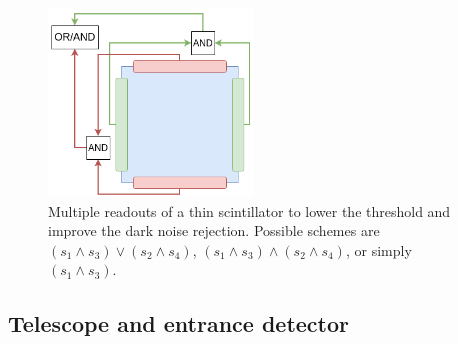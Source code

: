 \begin{refsection}
        \begin{figure}
            \centering
            \includegraphics[height = 5cm]{Figures/muEDM/Entrance/gate_multireadout.png}
            \caption{Multiple readouts of a thin scintillator to lower the threshold and improve the dark noise rejection. Possible schemes are $(s_1\land s_3)\lor(s_2\land s_4)$, $(s_1\land s_3)\land(s_2\land s_4)$, or simply $(s_1\land s_3)$.}
            \label{fig:muEDM:entrance:gate:readout}
        \end{figure}
        
    \subsection{Telescope and entrance detector}
        \begin{figure}   
            \centering
            \hfill
            \caption{}
            \label{fig:muEDM:entrance:sketches}
        \end{figure}
        

\end{refsection}
